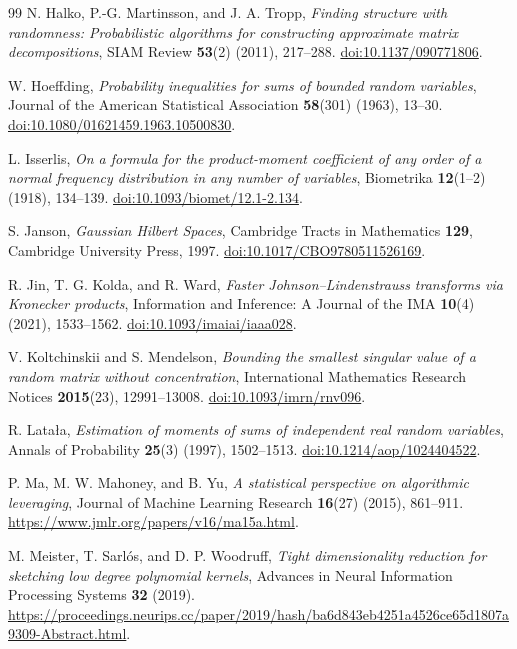 \documentclass[11pt,a4paper]{article}
\theoremstyle{definition}\newtheorem{definition}[theorem]{Definition}
\theoremstyle{remark}\newtheorem{remark}[theorem]{Remark}
\numberwithin{equation}{section}
\begin{document}
\begin{thebibliography}{99}
N. Halko, P.-G. Martinsson, and J. A. Tropp,
\emph{Finding structure with randomness: Probabilistic algorithms for
constructing approximate matrix decompositions},
SIAM Review \textbf{53}(2) (2011), 217--288.
\href{https://doi.org/10.1137/090771806}{doi:10.1137/090771806}.

W. Hoeffding,
\emph{Probability inequalities for sums of bounded random variables},
Journal of the American Statistical Association \textbf{58}(301) (1963),
13--30.
\href{https://doi.org/10.1080/01621459.1963.10500830}
{doi:10.1080/01621459.1963.10500830}.

L. Isserlis,
\emph{On a formula for the product-moment coefficient of any order of a
normal frequency distribution in any number of variables},
Biometrika \textbf{12}(1--2) (1918), 134--139.
\href{https://doi.org/10.1093/biomet/12.1-2.134}{doi:10.1093/biomet/12.1-2.134}.

S. Janson, \emph{Gaussian Hilbert Spaces}, Cambridge Tracts in Mathematics
\textbf{129}, Cambridge University Press, 1997.
\href{https://doi.org/10.1017/CBO9780511526169}{doi:10.1017/CBO9780511526169}.

R. Jin, T. G. Kolda, and R. Ward,
\emph{Faster Johnson--Lindenstrauss transforms via Kronecker products},
Information and Inference: A Journal of the IMA \textbf{10}(4) (2021),
1533--1562.
\href{https://doi.org/10.1093/imaiai/iaaa028}{doi:10.1093/imaiai/iaaa028}.

V. Koltchinskii and S. Mendelson,
\emph{Bounding the smallest singular value of a random matrix without
concentration}, International Mathematics Research Notices
\textbf{2015}(23), 12991--13008.
\href{https://doi.org/10.1093/imrn/rnv096}{doi:10.1093/imrn/rnv096}.

R. Lata\l{}a,
\emph{Estimation of moments of sums of independent real random variables},
Annals of Probability \textbf{25}(3) (1997), 1502--1513.
\href{https://doi.org/10.1214/aop/1024404522}{doi:10.1214/aop/1024404522}.

P. Ma, M. W. Mahoney, and B. Yu,
\emph{A statistical perspective on algorithmic leveraging},
Journal of Machine Learning Research \textbf{16}(27) (2015), 861--911.
\url{https://www.jmlr.org/papers/v16/ma15a.html}.

M. Meister, T. Sarl\'os, and D. P. Woodruff,
\emph{Tight dimensionality reduction for sketching low degree polynomial kernels},
Advances in Neural Information Processing Systems \textbf{32} (2019).
\url{https://proceedings.neurips.cc/paper/2019/hash/ba6d843eb4251a4526ce65d1807a9309-Abstract.html}.


\end{thebibliography}
\end{document}
